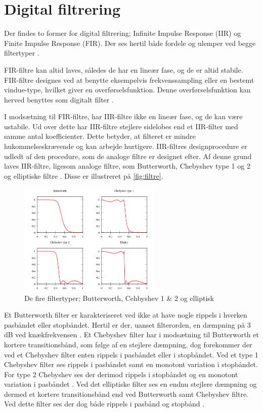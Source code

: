 \section{Digital filtrering}
Der findes to former for digital filtrering; Infinite Impulse Response (IIR) og Finite Impulse Response (FIR). Der ses hertil både fordele og ulemper ved begge filtertyper \citep{blandford2012}.

FIR-filtre kan altid laves, således de har en lineær fase, og de er altid stabile. FIR-filtre designes ved at benytte eksempelvis frekvenssampling eller en bestemt vindue-type, hvilket giver en overførselsfunktion. Denne overførselsfunktion kan herved benyttes som digitalt filter \citep{blandford2012}. 

I modsætning til FIR-filtre, har IIR-filtre ikke en lineær fase, og de kan være ustabile. Ud over dette har IIR-filtre stejlere sidelobes end et IIR-filter med samme antal koefficienter. Dette betyder, at filteret er mindre hukommelseskrævende og kan arbejde hurtigere. IIR-filtres designprocedure er udledt af den procedure, som de analoge filtre er designet efter. Af denne grund laves IIR-filtre, ligesom analoge filtre, som Butterworth, Chebyshev type 1 og 2 og elliptiske filtre \citep{blandford2012}. Disse er illustreret på \autoref{fig:filtre}. 
\\

\begin{figure}[H]
\centering
\includegraphics[width=0.6\textwidth]{figures/filtre}
\caption{De fire filtertyper; Butterworth, Cehbyshev 1 \& 2 og elliptisk \citep{wikipedia2016}}
\label{fig:filtre}
\end{figure}

Et Butterworth filter er karakteriseret ved ikke at have nogle rippels i hverken pasbåndet eller stopbåndet. Hertil er der, uanset filterorden, en dæmpning på 3 dB ved knækfrekvensen \citep{nilsson2015}.
Et Chebyshev filter har i modsætning til Butterworth et kortere transitionsbånd, som følge af en stejlere dæmpning, dog forekommer der ved et Chebyshev filter enten rippels i pasbåndet eller i stopbåndet. Ved et type 1 Chebyshev filter ses rippels i pasbåndet samt en monotont variation i stopbåndet. For type 2 Chebyshev ses der derimod rippels i stopbåndet og en monotont variation i pasbåndet \citep{nilsson2015}. 
Ved det elliptiske filter ses en endnu stejlere dæmpning og dermed et kortere transitionsbånd end ved Butterworth samt Chebyshev filtre. Ved dette filter ses der dog både rippels i pasbånd og stopbånd \citep{nilsson2015}. 


